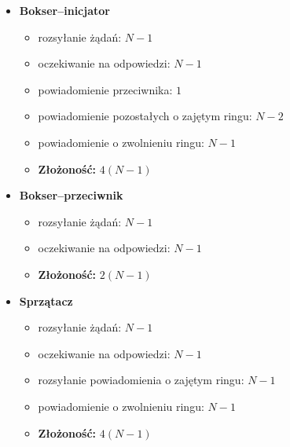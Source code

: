 \documentclass{article}
\begin{document}
\begin{itemize}
\item \textbf{Bokser--inicjator}
  \begin{itemize}
  \item rozsyłanie żądań: $N - 1$
  \item oczekiwanie na odpowiedzi: $N - 1$
  \item powiadomienie przeciwnika: $1$
  \item powiadomienie pozostałych o zajętym ringu: $N - 2$
  \item powiadomienie o zwolnieniu ringu: $N - 1$
  \item \textbf{Złożoność:} $4(N - 1)$
  \end{itemize}
\item \textbf{Bokser--przeciwnik}
  \begin{itemize}
  \item rozsyłanie żądań: $N - 1$
  \item oczekiwanie na odpowiedzi: $N - 1$
  \item \textbf{Złożoność:} $2(N - 1)$
  \end{itemize}
\item \textbf{Sprzątacz}
  \begin{itemize}
  \item rozsyłanie żądań: $N - 1$
  \item oczekiwanie na odpowiedzi: $N - 1$
  \item rozsyłanie powiadomienia o zajętym ringu: $N - 1$
  \item powiadomienie o zwolnieniu ringu: $N - 1$
  \item \textbf{Złożoność:} $4(N - 1)$
  \end{itemize}
\end{itemize}
\end{document}
